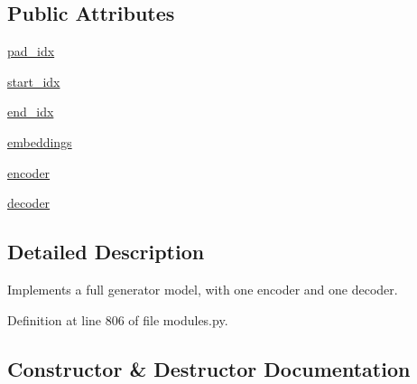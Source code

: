 \subsection*{Public Attributes}
\begin{DoxyCompactItemize}
\item 
\hyperlink{classparlai_1_1agents_1_1transformer_1_1modules_1_1TransformerGeneratorModel_aefac02b3630ef361bb008b4f7973c55b}{pad\+\_\+idx}
\item 
\hyperlink{classparlai_1_1agents_1_1transformer_1_1modules_1_1TransformerGeneratorModel_a381b6d63e5aba194730c36d9fb93c6d6}{start\+\_\+idx}
\item 
\hyperlink{classparlai_1_1agents_1_1transformer_1_1modules_1_1TransformerGeneratorModel_ab2b8403205fcd407e47546dc56022d2f}{end\+\_\+idx}
\item 
\hyperlink{classparlai_1_1agents_1_1transformer_1_1modules_1_1TransformerGeneratorModel_a18411754103e8c8f4cd2e9338351b98d}{embeddings}
\item 
\hyperlink{classparlai_1_1agents_1_1transformer_1_1modules_1_1TransformerGeneratorModel_af165b8ec1505f768c530aea02d68ae09}{encoder}
\item 
\hyperlink{classparlai_1_1agents_1_1transformer_1_1modules_1_1TransformerGeneratorModel_a6467f0fdec226329cb8efe77245996a5}{decoder}
\end{DoxyCompactItemize}


\subsection{Detailed Description}
\begin{DoxyVerb}Implements a full generator model, with one encoder and one decoder.
\end{DoxyVerb}
 

Definition at line 806 of file modules.\+py.



\subsection{Constructor \& Destructor Documentation}
\mbox{\label{classparlai_1_1agents_1_1transformer_1_1modules_1_1TransformerGeneratorModel_a17276e3090a132914c0adae133e60357}} 
